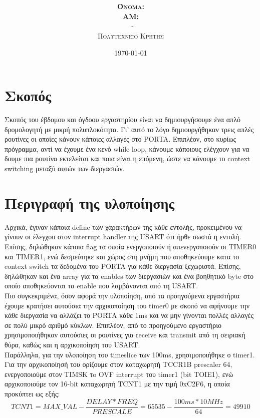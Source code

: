 \documentclass{article}
\title{\underline{\textbf{\assignmentNumber}}}
\author{\textsc{\textbf{Όνομα:}}  \studentName\\
		\textsc{\textbf{ΑΜ:}}  \studentNumber\\
		\course \ - \courseName\\ 
		\textsc{Πολυτεχνείο Κρήτης}
		}
\date{\today}
\begin{document}
	\maketitle

\section*{Σκοπός}
	Σκοπός του έβδομου και όγδοου εργαστηρίου είναι να δημιουργήσουμε ένα απλό δρομολογητή με μικρή πολυπλοκότητα. Γι' αυτό το λόγο δημιουργήθηκαν τρεις απλές ρουτίνες οι οποίες κάνουν κάποιες αλλαγές στο PORTA. Επιπλέον, στο κυρίως πρόγραμμα, αντί να έχουμε ένα κενό while loop, κάνουμε κάποιους ελέγχουν για να δουμε πια ρουτίνα εκτελείται και ποια είναι η επόμενη, ώστε να κάνουμε το context switching μεταξύ αυτών των διεργασιών.

\section*{Περιγραφή της υλοποίησης}
	Αρχικά, έγιναν κάποια define των χαρακτήρων της κάθε εντολής, προκειμένου να γίνουν οι έλεγχου στον interrupt handler της USART ότι ήρθε σωστά η εντολή. Επίσης, δηλώθηκαν κάποια flag τα οποία ενεργοποιούν ή απενεργοποιούν οι TIMER0 και TIMER1, ενώ δεσμεύτηκε και χώρος στη μνήμη που αποθηκεύουμε κατα το context switch τα δεδομένα του PORTA για κάθε διεργασία ξεχωριστά. Επίσης, δηλώθηκαν και ένα array για τα enables των διεργασιών και ένα βοηθητικό byte στο οποίο αποθηκεύονται τα enable που λαμβάνονται από τη USART.\\
	
	\noindent
	Πιο συγκεκριμένα, όσον αφορά την υλοποίηση, από τα προηγούμενα εργαστήρια έχουμε κρατήσει αυτούσια την αρχικοποίηση του timer0 με σκοπό να αφήνουμε την κάθε διεργασία να αλλάζει το PORTA κάθε 1ms και να μην γίνονται πολλές αλλαγές σε πολύ μικρό αριθμό κύκλων. Eπιπλέον, από το προηγούμενο εργαστήριο χρησιμοποιήθηκαν αυτούσιες οι ρουτίνες για receive και transmit από τη σειριακή θύρα, καθώς και η αρχικοποίηση του USART.\\
	
	\noindent
	Παράλληλα, για την υλοποίηση του timeslice των 100ms, χρησιμοποιήθηκε ο timer1. Για την αρχικοποίησή του ορίζουμε στον καταχωρητή TCCR1B prescaler 64, ενεργοποιούμε στον TIMSK τo OVF interrupt του timer1 (bit TOIE1), ενώ αρχικοποιούμε τον 16-bit καταχωρητή TCNT1 με την τιμή 0xC2F6, η οποία προκύπτει ως εξής: 
	$$ TCNT1 = MAX\_VAL - \frac{DELAY*FREQ}{PRESCALE} = 65535 - \frac{100 ms * 10 MHz}{64} = 49910$$
	
\end{document}
